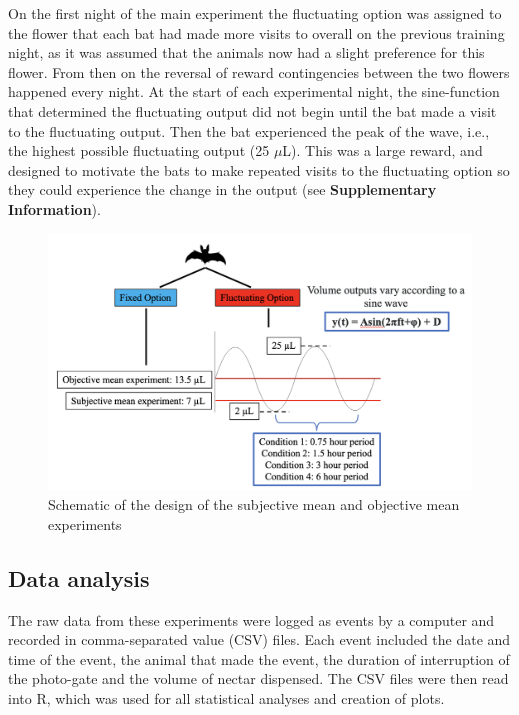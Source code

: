 \documentclass[
]{article}
\begin{document}
On the first night of the main experiment the fluctuating option was assigned to the flower that each bat had made more visits to overall on the previous training night, as it was assumed that the animals now had a slight preference for this flower. From then on the reversal of reward contingencies between the two flowers happened every night. At the start of each experimental night, the sine-function that determined the fluctuating output did not begin until the bat made a visit to the fluctuating output. Then the bat experienced the peak of the wave, i.e., the highest possible fluctuating output (25 \(\mu\)L). This was a large reward, and designed to motivate the bats to make repeated visits to the fluctuating option so they could experience the change in the output (see \textbf{Supplementary Information}).



\begin{figure}[H]

{\centering \includegraphics[width=18.22in]{images/design_schematic} 

}

\caption{Schematic of the design of the subjective mean and objective mean experiments}\label{fig:design-schematic}
\end{figure}

\hypertarget{data-analysis}{%
\subsection{Data analysis}\label{data-analysis}}

The raw data from these experiments were logged as events by a computer and recorded in comma-separated value (CSV) files. Each event included the date and time of the event, the animal that made the event, the duration of interruption of the photo-gate and the volume of nectar dispensed. The CSV files were then read into R, which was used for all statistical analyses and creation of plots.
\end{document}
